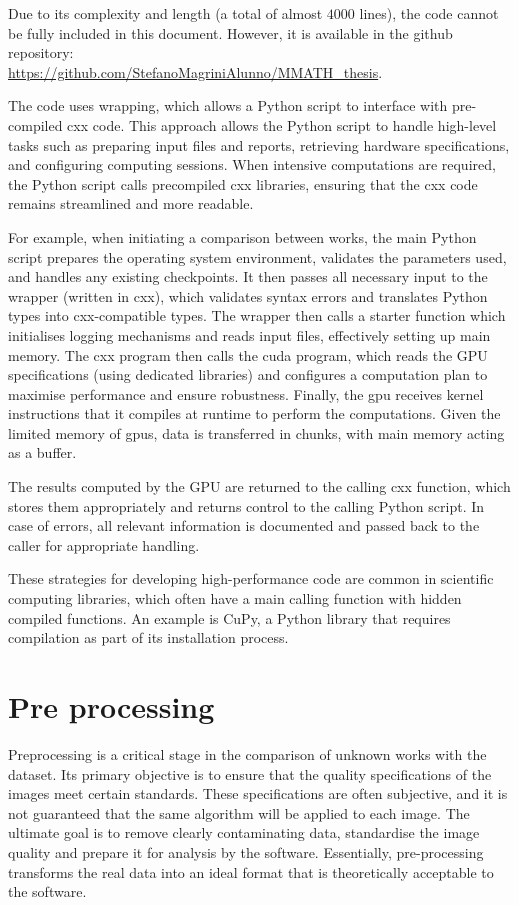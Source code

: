 \begin{toReview}
	\noindent Due to its complexity and length (a total of almost $4000$ lines), the code cannot be fully included in this document. However, it is available in the \gls{github} repository:\\ \url{https://github.com/StefanoMagriniAlunno/MMATH_thesis}.

	\bigskip\noindent The code uses wrapping, which allows a \gls{Python} script to interface with pre-compiled \gls{cxx} code. This approach allows the \gls{Python} script to handle high-level tasks such as preparing input files and reports, retrieving hardware specifications, and configuring computing sessions. When intensive computations are required, the \gls{Python} script calls precompiled \gls{cxx} libraries, ensuring that the \gls{cxx} code remains streamlined and more readable.

	\noindent For example, when initiating a comparison between works, the main \gls{Python} script prepares the operating system environment, validates the parameters used, and handles any existing checkpoints. It then passes all necessary input to the wrapper (written in \gls{cxx}), which validates syntax errors and translates Python types into \gls{cxx}-compatible types. The wrapper then calls a starter function which initialises logging mechanisms and reads input files, effectively setting up main memory. The \gls{cxx} program then calls the \gls{cuda} program, which reads the GPU specifications (using dedicated libraries) and configures a computation plan to maximise performance and ensure robustness. Finally, the \gls{gpu} receives kernel instructions that it compiles at runtime to perform the computations. Given the limited memory of \gls{gpu}s, data is transferred in chunks, with main memory acting as a buffer.

	\noindent The results computed by the GPU are returned to the calling \gls{cxx} function, which stores them appropriately and returns control to the calling \gls{Python} script. In case of errors, all relevant information is documented and passed back to the caller for appropriate handling.

	\noindent These strategies for developing high-performance code are common in scientific computing libraries, which often have a main calling function with hidden compiled functions. An example is CuPy, a \gls{Python} library that requires compilation as part of its installation process.

	\section{Pre processing}
	Preprocessing is a critical stage in the comparison of unknown works with the dataset. Its primary objective is to ensure that the quality specifications of the images meet certain standards. These specifications are often subjective, and it is not guaranteed that the same algorithm will be applied to each image. The ultimate goal is to remove clearly contaminating data, standardise the image quality and prepare it for analysis by the software. Essentially, pre-processing transforms the real data into an ideal format that is theoretically acceptable to the software.


\end{toReview}
